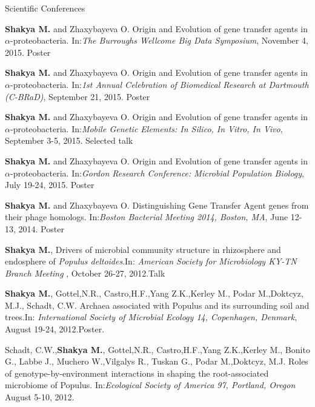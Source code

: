 \documentclass{resume} %
\begin{document}

\begin{rSection}{Scientific Conferences}

\item \textbf{Shakya M.} and Zhaxybayeva O. Origin and Evolution of gene transfer agents in $\alpha$-proteobacteria. In:\emph{The Burroughs Wellcome Big Data Symposium}, November 4, 2015. Poster

\item \textbf{Shakya M.} and Zhaxybayeva O. Origin and Evolution of gene transfer agents in $\alpha$-proteobacteria. In:\emph{1st Annual Celebration of Biomedical Research at Dartmouth (C-BRaD)}, September 21, 2015. Poster

\item \textbf{Shakya M.} and Zhaxybayeva O. Origin and Evolution of gene transfer agents in $\alpha$-proteobacteria. In:\emph{Mobile Genetic Elements: In Silico, In Vitro, In Vivo}, September 3-5, 2015. Selected talk

\item \textbf{Shakya M.} and Zhaxybayeva O. Origin and Evolution of gene transfer agents in $\alpha$-proteobacteria. In:\emph{Gordon Research Conference: Microbial Population Biology}, July 19-24, 2015. Poster

\item \textbf{Shakya M.} and Zhaxybayeva O. Distinguishing Gene Transfer Agent genes from their phage homologs. In:\emph{Boston Bacterial Meeting 2014, Boston, MA}, June 12-13, 2014. Poster

\item \textbf{Shakya M.}, Drivers of microbial community structure in rhizosphere and endosphere of \textit{Populus deltoides}.In: \emph{American Society for Microbiology KY-TN Branch Meeting }, October 26-27, 2012.Talk

\item  \textbf{Shakya M.}, Gottel,N.R., Castro,H.F.,Yang Z.K.,Kerley M., Podar M.,Doktcyz, M.J., Schadt, C.W. Archaea associated with Populus and its surrounding soil and trees.In: \emph{International Society of Microbial Ecology 14, Copenhagen, Denmark}, August 19-24, 2012.Poster.


\item Schadt, C.W.,\textbf{Shakya M.}, Gottel,N.R., Castro,H.F.,Yang Z.K.,Kerley M., Bonito G., Labbe J., Muchero W.,Vilgalys R., Tuskan G., Podar M.,Doktcyz, M.J. Roles of genotype-by-environment interactions in shaping the root-associated microbiome of Populus. In:\emph{Ecological Society of America 97, Portland, Oregon} August 5-10, 2012.


\end{rSection}
\end{document}
